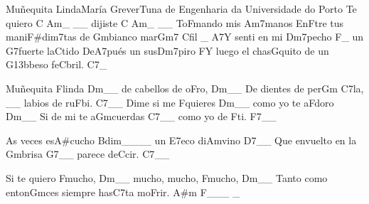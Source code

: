 \begin{musica}{Muñequita Linda}{María Grever}{Tuna de Engenharia da Universidade do Porto}
Te quiero \ac{C Am}{}_ __ dijiste \ac{C Am}{}_ __
To\ac{F}{man}do mis \ac{Am7}{ma}nos
En\ac{F}{tre} tus mani\ac{F#dim7}{tas} de \ac{Gm}{bian}co mar\ac{Gm7 C}{fil} _
\ac{A7}{Y} senti en mi \ac{Dm7}{pe}cho \ac{F}{}_ un \ac{G7}{fuer}te la\ac{C}{ti}do
De\ac{A7}{pués} un sus\ac{Dm7}{pi}ro
\ac{F}{Y} luego el chas\ac{G}{qui}to de un \ac{G13b}{be}so fe\ac{C}{bril}. \ac{C7}{}_

Muñequita \ac{F}{lin}da \ac{Dm}{}__ de cabellos de o\ac{F}{ro}, \ac{Dm}{}__
De dientes de per\ac{Gm C7}{la}, __ labios de ru\ac{F}{bi}. \ac{C7}{}__
Dime si me \ac{F}{quie}res \ac{Dm}{}__ como yo te a\ac{F}{do}ro \ac{Dm}{}__
Si de mi te a\ac{Gm}{cuer}das \ac{C7}{}__ como yo de \ac{F}{ti}. \ac{F7}{}__

As veces es\ac{A#}{cu}cho \ac{Bdim}{}____ un \ac{E7}{eco} di\ac{Am}{vi}no \ac{D7}{}__
Que envuelto en la \ac{Gm}{bri}sa \ac{G7}{}__ parece de\ac{C}{cir}. \ac{C7}{}__

Si te quiero \ac{F}{mu}cho, \ac{Dm}{}__ mucho, mucho, \ac{F}{mu}cho, \ac{Dm}{}__
Tanto como enton\ac{Gm}{ces} siempre has\ac{C7}{ta} mo\ac{F}{rir}. \ac{A#m F}{}___ _

\end{musica}
